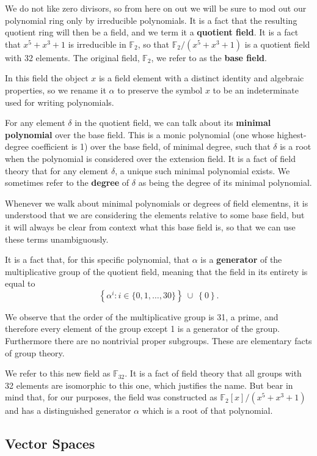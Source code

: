\documentclass[letterpaper]{article}
\newcommand{\ftwo}{\mathbb{F}_2}
\newcommand{\fttwo}{\mathbb{F}_{32}}
\begin{document}
We do not like zero divisors, so from here on out we will be sure to mod out
our polynomial ring only by irreducible polynomials. It is a fact that the
resulting quotient ring will then be a field, and we term it a \textbf{quotient
field}. It is a fact that $x^5 + x^3 + 1$ is irreducible in $\ftwo$, so that
$\ftwo/(x^5 + x^3 + 1)$ is a quotient field with 32 elements. The original
field, $\ftwo$, we refer to as the \textbf{base field}.

In this field the object $x$ is a field element with a distinct identity and
algebraic properties, so we rename it $\alpha$ to preserve the symbol $x$ to
be an indeterminate used for writing polynomials.

For any element $\delta$ in the quotient field, we can talk about its
\textbf{minimal polynomial} over the base field. This is a monic polynomial
(one whose highest-degree coefficient is 1) over the base field, of minimal
degree, such that $\delta$ is a root when the polynomial is considered over
the extension field. It is a fact of field theory that for any element
$\delta$, a unique such minimal polynomial exists. We sometimes refer to the
\textbf{degree} of $\delta$ as being the degree of its minimal polynomial.

Whenever we walk about minimal polynomials or degrees of field elementns, it
is understood that we are considering the elements relative to some base field,
but it will always be clear from context what this base field is, so that we
can use these terms unambiguously.

It is a fact that, for this specific polynomial, that $\alpha$ is a
\textbf{generator} of the multiplicative group of the quotient field, meaning
that the field in its entirety is equal to
\[ \left\{ \alpha^i : i \in \{0,1,\ldots,30\} \right\} ~\cup~ \left\{ 0 \right\}. \]

We observe that the order of the multiplicative group is 31, a prime, and therefore
every element of the group except 1 is a generator of the group. Furthermore there
are no nontrivial proper subgroups. These are elementary facts of group theory.

We refer to this new field as $\fttwo$. It is a fact of field theory that all
groups with 32 elements are isomorphic to this one, which justifies the name.
But bear in mind that, for our purposes, the field was constructed as $\ftwo[x]/
(x^5 + x^3 + 1)$ and has a distinguished generator $\alpha$ which is a root
of that polynomial.

\subsection{Vector Spaces}
\end{document}
